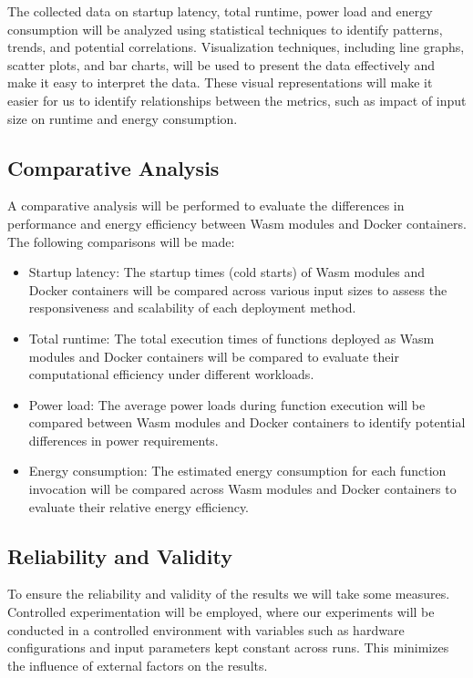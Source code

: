 \documentclass[
  table]{report}
\begin{document}
The collected data on startup latency, total runtime, power load and
energy consumption will be analyzed using statistical techniques to
identify patterns, trends, and potential correlations. Visualization
techniques, including line graphs, scatter plots, and bar charts, will
be used to present the data effectively and make it easy to interpret
the data. These visual representations will make it easier for us to
identify relationships between the metrics, such as impact of input size
on runtime and energy consumption.

\subsection{Comparative Analysis}
\label{sect:comp_anal}

A comparative analysis will be performed to evaluate the differences in
performance and energy efficiency between Wasm modules and Docker
containers. The following comparisons will be made:

\begin{itemize}
\item
  Startup latency: The startup times (cold starts) of Wasm modules and
  Docker containers will be compared across various input sizes to
  assess the responsiveness and scalability of each deployment method.
\item
  Total runtime: The total execution times of functions deployed as Wasm
  modules and Docker containers will be compared to evaluate their
  computational efficiency under different workloads.
\item
  Power load: The average power loads during function execution will be
  compared between Wasm modules and Docker containers to identify
  potential differences in power requirements.
\item
  Energy consumption: The estimated energy consumption for each function
  invocation will be compared across Wasm modules and Docker containers
  to evaluate their relative energy efficiency.
\end{itemize}

\subsection{Reliability and Validity}

To ensure the reliability and validity of the results we will take some
measures. Controlled experimentation will be employed, where our
experiments will be conducted in a controlled environment with variables
such as hardware configurations and input parameters kept constant
across runs. This minimizes the influence of external factors on the
results.
\end{document}
